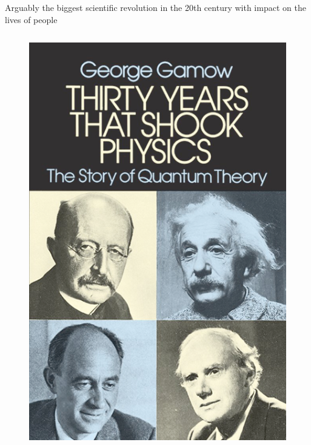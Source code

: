\documentclass[aspectratio=169]{beamer}
\begin{document}
\begin{frame}{Arguably the biggest scientific revolution in the 20th century with impact on the lives of people}
\begin{columns}
\begin{figure}
                \includegraphics[width=\linewidth]{lectures/figures/30yearsthatshookphysics.png}
            \end{figure}
        \end{columns}
    \end{frame}
\end{document}
